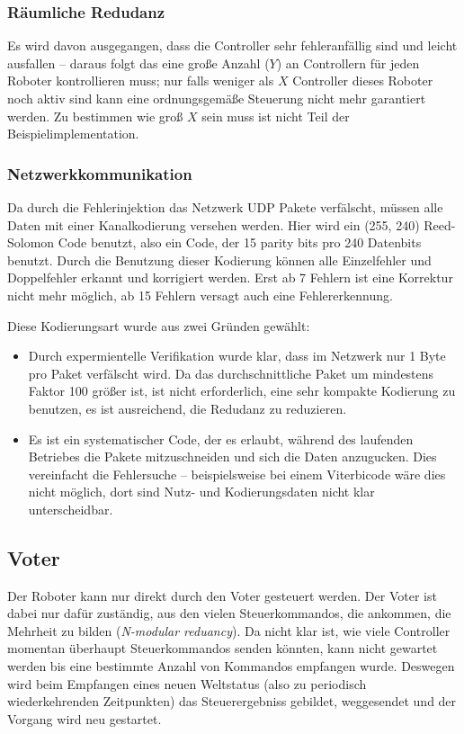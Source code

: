 {\subsubsection{R{\"{a}}umliche Redudanz}
Es wird davon ausgegangen, dass die Controller sehr fehleranf{\"{a}}llig sind und leicht ausfallen --
daraus folgt das eine gro{\ss}e Anzahl ($Y$) an Controllern f{\"{u}}r jeden Roboter kontrollieren muss;
nur falls weniger als $X$ Controller dieses Roboter noch aktiv sind kann eine ordnungsgem{\"{a}}{\ss}e
Steuerung nicht mehr garantiert werden. Zu bestimmen wie gro{\ss} $X$ sein muss ist nicht Teil der
Beispielimplementation.

\subsubsection{Netzwerkkommunikation}
Da durch die Fehlerinjektion das Netzwerk UDP Pakete verf{\"{a}}lscht, m{\"{u}}ssen alle Daten mit einer 
Kanalkodierung versehen werden. Hier wird ein (255, 240) Reed-Solomon Code benutzt, also ein Code, der 15 parity 
bits pro 240 Datenbits benutzt. Durch die Benutzung dieser Kodierung k{\"{o}}nnen alle Einzelfehler und 
Doppelfehler erkannt und korrigiert werden. Erst ab 7 Fehlern ist eine Korrektur nicht mehr m{\"{o}}glich, ab 15 
Fehlern versagt auch eine Fehlererkennung.

Diese Kodierungsart wurde aus zwei Gr{\"{u}}nden gew{\"{a}}hlt:
\begin{itemize}
\item Durch expermientelle Verifikation wurde klar, dass im Netzwerk nur 1 Byte pro Paket verf{\"{a}}lscht wird.
	Da das durchschnittliche Paket um mindestens Faktor 100 gr{\"{o}}{\ss}er ist, ist nicht erforderlich,
	eine sehr kompakte Kodierung zu benutzen, es ist ausreichend, die Redudanz zu reduzieren. 
\item Es ist ein systematischer Code, der es erlaubt, w{\"{a}}hrend des laufenden Betriebes die Pakete 
	mitzuschneiden und sich die Daten anzugucken. Dies vereinfacht die Fehlersuche -- beispielsweise bei
	einem Viterbicode w{\"{a}}re dies nicht m{\"{o}}glich, dort sind Nutz- und Kodierungsdaten nicht klar 
	unterscheidbar.
\end{itemize}

\subsection{Voter}
\label{voter}
Der Roboter kann nur direkt durch den Voter gesteuert werden. Der Voter ist dabei nur daf{\"{u}}r
zust{\"{a}}ndig, aus den vielen Steuerkommandos, die ankommen, die Mehrheit zu bilden (\textit{N-modular reduancy}).
Da nicht klar ist, wie viele Controller momentan {\"{u}}berhaupt Steuerkommandos senden k{\"{o}}nnten,
kann nicht gewartet werden bis eine bestimmte Anzahl von Kommandos empfangen wurde. Deswegen wird beim Empfangen
eines neuen Weltstatus (also zu periodisch wiederkehrenden Zeitpunkten) das Steuerergebniss gebildet,
weggesendet und der Vorgang wird neu gestartet.

}
